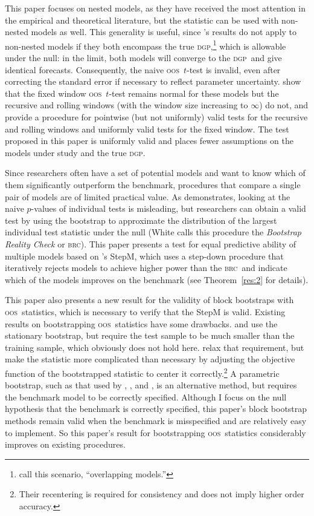 \documentclass[11pt,fleqn]{article}
\newcommand\citepos[2][]{\citeauthor{#2}'s \citeyearpar[#1]{#2}}
\theoremstyle{definition}
\newcommand{\brc}{\textsc{brc}}
\newcommand{\dgp}{\textsc{dgp}}
\newcommand{\oos}{\textsc{oos}}
\begin{document}
This paper focuses on nested models, as they have received the most
attention in the empirical and theoretical literature, but the
statistic can be used with non-nested models as well.  This generality
is useful, since \citepos{Wes:96} results do not apply to non-nested
models if they both encompass the true \dgp,\footnote{\citet{ClM:11b}
  call this scenario, ``overlapping models.''} which is allowable
under the null: in the limit, both models will converge to the \dgp\
and give identical forecasts.  Consequently, the naive \oos\ $t$-test
is invalid, even after correcting the standard error if necessary to
reflect parameter uncertainty.  \citet{ClM:11b} show that the fixed
window \oos\ $t$-test remains normal for these models but the
recursive and rolling windows (with the window size increasing to
$\infty$) do not, and provide a procedure for pointwise (but not
uniformly) valid tests for the recursive and rolling windows and
uniformly valid tests for the fixed window.  The test proposed in this
paper is uniformly valid and places fewer assumptions on the models
under study and the true \dgp.

Since researchers often have a set of potential models and want to
know which of them significantly outperform the benchmark, procedures
that compare a single pair of models are of limited practical value.
As \citet{Whi:00} demonstrates, looking at the naive $p$-values of
individual tests is misleading, but researchers can obtain a valid test
by using the bootstrap to approximate the distribution of the largest
individual test statistic under the null (White calls this procedure
the \textit{Bootstrap Reality Check} or \brc).  This paper presents a test
for equal predictive ability of multiple models based on
\citepos{RoW:05} StepM, which uses a step-down procedure that
iteratively rejects models to achieve higher power than the \brc\ and
indicate which of the models improves on the benchmark (see
Theorem~\ref{res:2} for details).

This paper also presents a new result for the validity of block
bootstraps with \oos\ statistics, which is necessary to verify that
the StepM is valid.  Existing results on bootstrapping \oos\
statistics have some drawbacks.  \citet{Whi:00} and \citet{Han:05} use
the stationary bootstrap, but require the test sample to be much
smaller than the training sample, which obviously does not hold here.
\citet{CoS:07} relax that requirement, but make the statistic more
complicated than necessary by adjusting the objective function of the
bootstrapped statistic to center it correctly.\footnote{Their
  recentering is required for consistency and does not imply higher
  order accuracy.}  A parametric bootstrap, such as that used by
\cite{Mar:95}, \cite{Lut:99}, and \citet{ClM:12b}, is an alternative
method, but requires the benchmark model to be correctly specified.
Although I focus on the null hypothesis that the benchmark is
correctly specified, this paper's block bootstrap methods remain valid
when the benchmark is misspecified and are relatively easy to
implement.  So this paper's result for bootstrapping \oos\ statistics
considerably improves on existing procedures.
\end{document}
